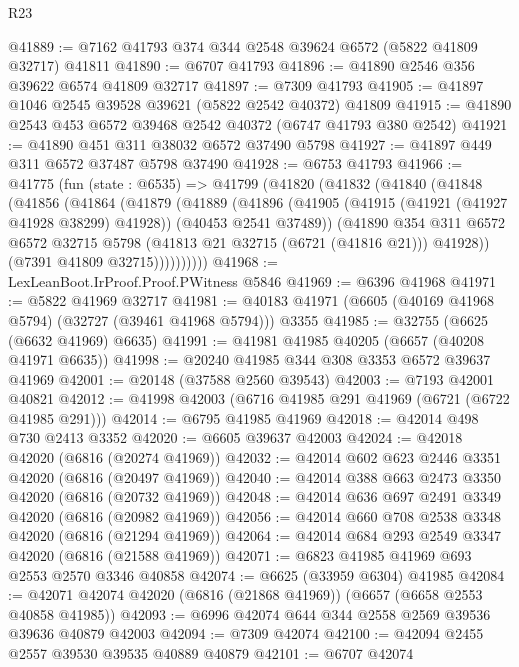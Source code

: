 \begin{lexlean}{R23}
\begin{coremodule}
@41889 := @7162 @41793 @374 @344 @2548 @39624 @6572 (@5822 @41809 @32717) @41811
@41890 := @6707 @41793
@41896 := @41890 @2546 @356 @39622 @6574 @41809 @32717
@41897 := @7309 @41793
@41905 := @41897 @1046 @2545 @39528 @39621 (@5822 @2542 @40372) @41809
@41915 := @41890 @2543 @453 @6572 @39468 @2542 @40372 (@6747 @41793 @380 @2542)
@41921 := @41890 @451 @311 @38032 @6572 @37490 @5798
@41927 := @41897 @449 @311 @6572 @37487 @5798 @37490
@41928 := @6753 @41793
@41966 := @41775
    (fun (state : @6535) =>
    @41799
      (@41820
        (@41832
          (@41840
            (@41848
              (@41856
                (@41864
                  (@41879
                    (@41889
                      (@41896
                        (@41905
                          (@41915 (@41921 (@41927 @41928 @38299) @41928))
                          (@40453 @2541 @37489))
                        (@41890
                          @354
                          @311
                          @6572
                          @6572
                          @32715
                          @5798
                          (@41813 @21 @32715 (@6721 (@41816 @21)))
                          @41928))
                      (@7391 @41809 @32715))))))))))
@41968 := LexLeanBoot.IrProof.Proof.PWitness @5846
@41969 := @6396 @41968
@41971 := @5822 @41969 @32717
@41981 := @40183 @41971 (@6605 (@40169 @41968 @5794) (@32727 (@39461 @41968 @5794))) @3355
@41985 := @32755 (@6625 (@6632 @41969) @6635)
@41991 := @41981 @41985 @40205 (@6657 (@40208 @41971 @6635))
@41998 := @20240 @41985 @344 @308 @3353 @6572 @39637 @41969
@42001 := @20148 (@37588 @2560 @39543)
@42003 := @7193 @42001 @40821
@42012 := @41998 @42003 (@6716 @41985 @291 @41969 (@6721 (@6722 @41985 @291)))
@42014 := @6795 @41985 @41969
@42018 := @42014 @498 @730 @2413 @3352
@42020 := @6605 @39637 @42003
@42024 := @42018 @42020 (@6816 (@20274 @41969))
@42032 := @42014 @602 @623 @2446 @3351 @42020 (@6816 (@20497 @41969))
@42040 := @42014 @388 @663 @2473 @3350 @42020 (@6816 (@20732 @41969))
@42048 := @42014 @636 @697 @2491 @3349 @42020 (@6816 (@20982 @41969))
@42056 := @42014 @660 @708 @2538 @3348 @42020 (@6816 (@21294 @41969))
@42064 := @42014 @684 @293 @2549 @3347 @42020 (@6816 (@21588 @41969))
@42071 := @6823 @41985 @41969 @693 @2553 @2570 @3346 @40858
@42074 := @6625 (@33959 @6304) @41985
@42084 := @42071 @42074 @42020 (@6816 (@21868 @41969)) (@6657 (@6658 @2553 @40858 @41985))
@42093 := @6996 @42074 @644 @344 @2558 @2569 @39536 @39636 @40879 @42003
@42094 := @7309 @42074
@42100 := @42094 @2455 @2557 @39530 @39535 @40889 @40879
@42101 := @6707 @42074

\end{coremodule}
\end{lexlean}
